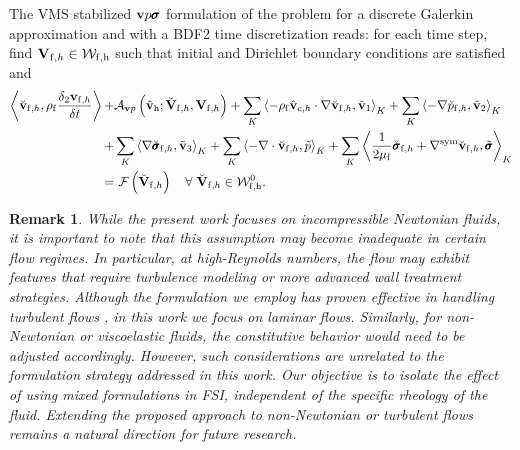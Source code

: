 \documentclass[11pt,english]{article}
\def\hatalevelocityh{\hat{\vb{v}}_{\mathrm{c},h}}
\def\densfluid{\rho_{\rm{f}}}                %
\def\viscfluid{\mu_{\rm{f}}}                 %
\def\testfluidh{\breve{\vb{V}}_{{\rm f} ,h}}
\def\testvfluidh{\breve{\vb{v}}_{{\rm f} ,h}}
\def\testpfluidh{\breve{p}_{{\rm f},h}}
\def\testsigmafluidh{\breve{\pmb{\sigma}}_{{\rm f},h}}
\def\unknofluidh{\vb{V}_{\mathrm{f},h}}
\def\vfluidh{\vb{v}_{{\mathrm{f}},h}}
\def\vhath{\hat{\vb{v}}_{\rm{h}}}
\def\unknofluidspaceh{\mathcal{W}_{\rm{f},\rm{h}}}        %
\def\testfluidspaceh{\mathcal{W}_{\rm{f},\rm{h}}^{0}}     %
\def\vpsigma{\vb{v}p\pmb{\sigma}}
\def\vp{\vb{v}p}
\newtheorem{remark}{Remark}[section]
\begin{document}
The VMS stabilized $\vpsigma$ formulation of the problem for a discrete Galerkin approximation and with a BDF2 time discretization reads: for each time step, find $\unknofluidh \in  \unknofluidspaceh $ such that initial and Dirichlet boundary conditions are satisfied and
\begin{align*}
\begin{split}
  \left \langle  \testvfluidh, \densfluid\frac{\delta_2 \vfluidh}{\delta t} \right \rangle +&  \mathcal{A}_{\vp} \left (\vhath;  \testfluidh, \unknofluidh \right) 
  + \sum_{K} \left \langle  - \densfluid\hatalevelocityh \cdot \nabla \testvfluidh, \tilde{\vb{v}}_1 \right \rangle_K 
  + \sum_{K} \left \langle  -\nabla \testpfluidh, \tilde{\vb{v}}_2 \right \rangle_K \\
  + &\sum_{K} \left \langle  \nabla \testsigmafluidh, \tilde{\vb{v}}_3 \right \rangle_K + \sum_{K} \left \langle  -\nabla \cdot \testvfluidh, \tilde{p} \right \rangle_K + \sum_{K} \left \langle  \dfrac{1}{2\viscfluid}\testsigmafluidh +\nabla^{\rm sym}\testvfluidh, \tilde{\pmb{\sigma}} \right \rangle_K\\
  = & ~\mathcal{F} \left ( \testfluidh  \right) \quad \forall \ \testfluidh \in \testfluidspaceh.
\end{split}
\end{align*}

\begin{remark}
{While the present work focuses on incompressible Newtonian fluids, it is important to note that this assumption may become inadequate in certain flow regimes. In particular, at high-Reynolds numbers, the flow may exhibit features that require turbulence modeling or more advanced wall treatment strategies. Although the formulation we employ has proven effective in handling turbulent flows \cite{HughesOberaiMazzei,Guasch-codina-2013,ColomesBadia2015}, in this work we focus on laminar flows.
Similarly, for non-Newtonian or viscoelastic fluids, the constitutive behavior would need to be adjusted accordingly. However, such considerations are unrelated to the formulation strategy addressed in this work. Our objective is to isolate the effect of using mixed formulations in FSI, independent of the specific rheology of the fluid. Extending the proposed approach to non-Newtonian or turbulent flows remains a natural direction for future research.}
\end{remark}


%
%
\end{document}
